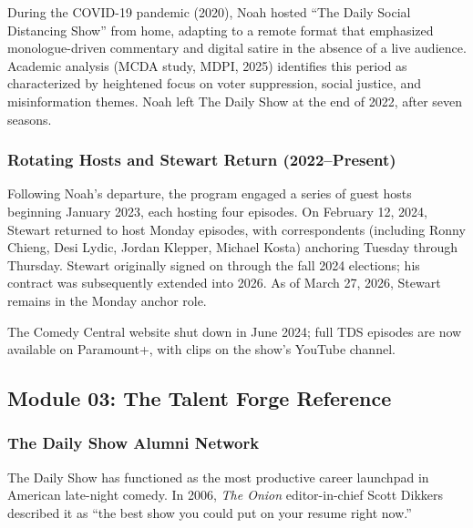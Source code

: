 \documentclass[11pt,letterpaper]{article}
\begin{document}
During the COVID-19 pandemic (2020), Noah hosted ``The Daily Social Distancing Show'' from home, adapting to a remote format that emphasized monologue-driven commentary and digital satire in the absence of a live audience. Academic analysis (MCDA study, MDPI, 2025) identifies this period as characterized by heightened focus on voter suppression, social justice, and misinformation themes. Noah left The Daily Show at the end of 2022, after seven seasons.

\subsubsection{Rotating Hosts and Stewart Return (2022--Present)}

Following Noah's departure, the program engaged a series of guest hosts beginning January 2023, each hosting four episodes. On February 12, 2024, Stewart returned to host Monday episodes, with correspondents (including Ronny Chieng, Desi Lydic, Jordan Klepper, Michael Kosta) anchoring Tuesday through Thursday. Stewart originally signed on through the fall 2024 elections; his contract was subsequently extended into 2026. As of March 27, 2026, Stewart remains in the Monday anchor role.

The Comedy Central website shut down in June 2024; full TDS episodes are now available on Paramount+, with clips on the show's YouTube channel.

\subsection{Module 03: The Talent Forge Reference}

\subsubsection{The Daily Show Alumni Network}

The Daily Show has functioned as the most productive career launchpad in American late-night comedy. In 2006, \textit{The Onion} editor-in-chief Scott Dikkers described it as ``the best show you could put on your resume right now.''
\end{document}
